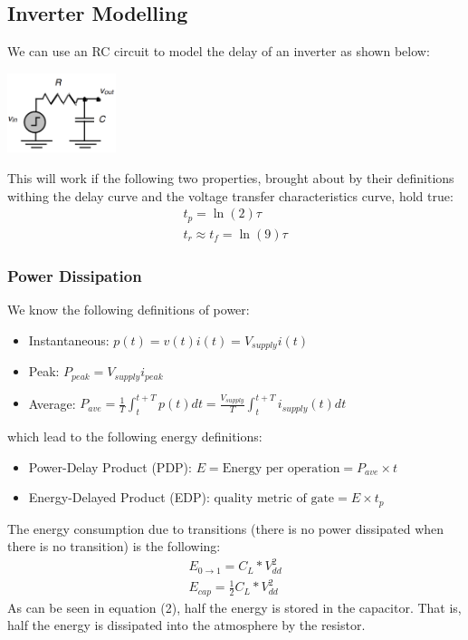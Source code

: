 \documentclass[nobib,fleqn,8pt]{article}
\begin{document}
\subsection{Inverter Modelling}
We can use an RC circuit to model the delay of an inverter as shown below:
\begin{center}
    \includegraphics*[width = 120px]{images/rc_inverter_delay.png}
\end{center}
This will work if the following two properties, brought about by their definitions withing the delay curve and the voltage transfer characteristics curve, hold true:
\begin{eqnarray*}
    t_p = \ln(2)\tau\\
    t_r \approx t_f = \ln(9)\tau
\end{eqnarray*}
\subsubsection{Power Dissipation}
We know the following definitions of power:
\begin{itemize}
    \item Instantaneous: $p(t) = v(t)i(t) = V_{supply} i(t)$
    \item Peak: $P_{peak} = V_{supply}i_{peak}$
    \item Average: $P_{ave} = \frac{1}{T}\int_{t}^{t+T}p(t)dt =
              \frac{V_{supply}}{T}\int_{t}^{t+T} i_{supply}(t)dt$
\end{itemize}
which lead to the following energy definitions:
\begin{itemize}
    \item Power-Delay Product (PDP): $E = \text{Energy per operation} = P_{ave}\times t$
    \item Energy-Delayed Product (EDP): $\text{quality metric of gate} = E \times t_p$
\end{itemize}
The energy consumption due to transitions (there is no power dissipated when there is no transition) is the following:
\begin{eqnarray}
    E_{0\rightarrow 1} = C_L * V_{dd}^2\\
    E_{cap} = \frac{1}{2}C_L * V_{dd}^2
\end{eqnarray}
As can be seen in equation (2), half the energy is stored in the capacitor. That is, half the energy is dissipated into the atmosphere by the resistor.\\
\end{document}
